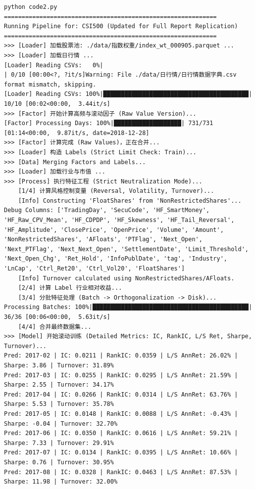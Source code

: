 \documentclass[10pt,compsoc,UTF8]{CjC}
\begin{document}
\begin{lstlisting}
python code2.py
============================================================
Running Pipeline for: CSI500 (Updated for Full Report Replication)
============================================================
>>> [Loader] 加载股票池: ./data/指数权重/index_wt_000905.parquet ...
>>> [Loader] 加载日行情 ...
[Loader] Reading CSVs:   0%|                                                  | 0/10 [00:00<?, ?it/s]Warning: File ./data/日行情/日行情数据字典.csv format mismatch, skipping.
[Loader] Reading CSVs: 100%|█████████████████████████████████████████| 10/10 [00:02<00:00,  3.44it/s]
>>> [Factor] 开始计算高频与滚动因子 (Raw Value Version)...
[Factor] Processing Days: 100%|███████████████████| 731/731 [01:14<00:00,  9.87it/s, date=2018-12-28]
>>> [Factor] 计算完成 (Raw Values)，正在合并...
>>> [Loader] 构造 Labels (Strict Limit Check: Train)...
>>> [Data] Merging Factors and Labels...
>>> [Loader] 加载行业与市值 ...
>>> [Process] 执行特征工程 (Strict Neutralization Mode)...
    [1/4] 计算风格控制变量 (Reversal, Volatility, Turnover)...
    [Info] Constructing 'FloatShares' from 'NonRestrictedShares'...
Debug Columns: ['TradingDay', 'SecuCode', 'HF_SmartMoney', 'HF_Raw_CPV_Mean', 'HF_CDPDP', 'HF_Skewness', 'HF_Tail_Reversal', 'HF_Amplitude', 'ClosePrice', 'OpenPrice', 'Volume', 'Amount', 'NonRestrictedShares', 'AFloats', 'PTFlag', 'Next_Open', 'Next_PTFlag', 'Next_Next_Open', 'SettlementDate', 'Limit_Threshold', 'Next_Open_Chg', 'Ret_Hold', 'InfoPublDate', 'tag', 'Industry', 'LnCap', 'Ctrl_Ret20', 'Ctrl_Vol20', 'FloatShares']
    [Info] Turnover calculated using NonRestrictedShares/AFloats.
    [2/4] 计算 Label 行业相对收益...
    [3/4] 分批特征处理 (Batch -> Orthogonalization -> Disk)...
Processing Batches: 100%|████████████████████████████████████████████| 36/36 [00:06<00:00,  5.63it/s]
    [4/4] 合并最终数据集...
>>> [Model] 开始滚动训练 (Detailed Metrics: IC, RankIC, L/S Ret, Sharpe, Turnover)...
Pred: 2017-02 | IC: 0.0211 | RankIC: 0.0359 | L/S AnnRet: 26.02% | Sharpe: 3.86 | Turnover: 31.89%   
Pred: 2017-03 | IC: 0.0255 | RankIC: 0.0295 | L/S AnnRet: 21.59% | Sharpe: 2.55 | Turnover: 34.17%   
Pred: 2017-04 | IC: 0.0266 | RankIC: 0.0314 | L/S AnnRet: 63.76% | Sharpe: 5.53 | Turnover: 35.78%   
Pred: 2017-05 | IC: 0.0148 | RankIC: 0.0088 | L/S AnnRet: -0.43% | Sharpe: -0.04 | Turnover: 32.70%  
Pred: 2017-06 | IC: 0.0350 | RankIC: 0.0616 | L/S AnnRet: 59.21% | Sharpe: 7.33 | Turnover: 29.91%   
Pred: 2017-07 | IC: 0.0134 | RankIC: 0.0395 | L/S AnnRet: 10.66% | Sharpe: 0.76 | Turnover: 30.95%   
Pred: 2017-08 | IC: 0.0328 | RankIC: 0.0463 | L/S AnnRet: 87.53% | Sharpe: 11.98 | Turnover: 32.00%  

\end{lstlisting}
\end{document}
